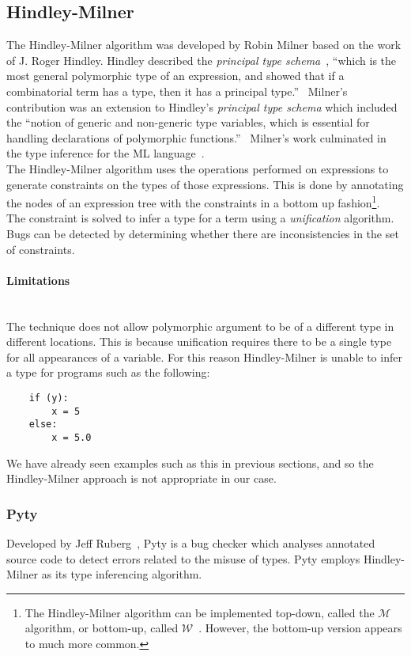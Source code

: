 \documentclass[12pt, titlepage]{article}
\begin{document}
\subsection{Hindley-Milner}
The Hindley-Milner algorithm was developed by Robin Milner based on the work of J. Roger Hindley. Hindley described the \textit{principal
type schema}~\cite{hindley69}, ``which is the most general polymorphic type of an expression, and showed that if a combinatorial term has a type, then it has a principal type.''~\cite{cardelli87} Milner's contribution was an extension to Hindley's \textit{principal type schema} which included the ``notion of generic and non-generic type variables, which is essential for handling declarations of polymorphic functions.''~\cite{cardelli87} Milner's work culminated in the type inference for the ML language~\cite{milner84}. \\
The Hindley-Milner algorithm uses the operations performed on expressions to generate constraints on the types of those expressions. This is done by annotating the nodes of an expression tree with the constraints in a bottom up fashion\footnote{The Hindley-Milner algorithm can be implemented top-down, called the $\mathcal{M}$ algorithm, or bottom-up, called $\mathcal{W}$~\cite{heeren02}. However, the bottom-up version appears to much more common.}. \\ The constraint is solved to infer a type for a term using a \textit{unification} algorithm.
Bugs can be detected by determining whether there are inconsistencies in the set of constraints.

\paragraph{Limitations}\mbox{}\\
The technique does not allow polymorphic argument to be of a different type in different locations. This is because unification requires there to be a single type for all appearances of a variable. For this reason Hindley-Milner is unable to infer a type for programs such as the following:
\begin{lstlisting}
	if (y):	
		x = 5     
	else:
		x = 5.0   
\end{lstlisting}
We have already seen examples such as this in previous sections, and so the Hindley-Milner approach is not appropriate in our case.

\subsubsection{Pyty}
Developed by Jeff Ruberg~\cite{pyty}, Pyty is a bug checker which analyses annotated source code to detect errors related to the misuse of types. Pyty employs Hindley-Milner as its type inferencing algorithm.
\end{document}
